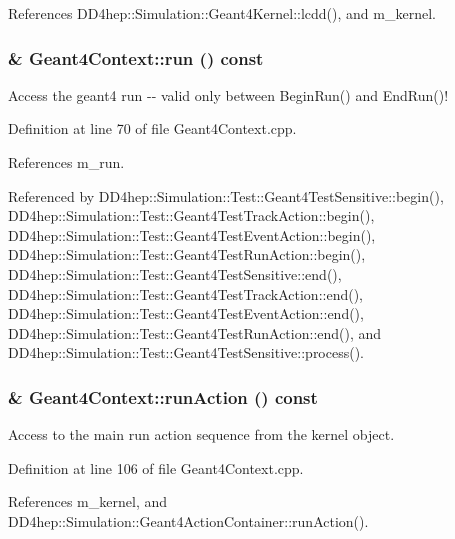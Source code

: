 References DD4hep::Simulation::Geant4Kernel::lcdd(), and m\_\-kernel.\hypertarget{class_d_d4hep_1_1_simulation_1_1_geant4_context_a5bdead358308c241c59b7fa5f68a2b16}{
\subsubsection[{run}]{ \& Geant4Context::run () const}}
\label{class_d_d4hep_1_1_simulation_1_1_geant4_context_a5bdead358308c241c59b7fa5f68a2b16}


Access the geant4 run -\/-\/ valid only between BeginRun() and EndRun()! 

Definition at line 70 of file Geant4Context.cpp.

References m\_\-run.

Referenced by DD4hep::Simulation::Test::Geant4TestSensitive::begin(), DD4hep::Simulation::Test::Geant4TestTrackAction::begin(), DD4hep::Simulation::Test::Geant4TestEventAction::begin(), DD4hep::Simulation::Test::Geant4TestRunAction::begin(), DD4hep::Simulation::Test::Geant4TestSensitive::end(), DD4hep::Simulation::Test::Geant4TestTrackAction::end(), DD4hep::Simulation::Test::Geant4TestEventAction::end(), DD4hep::Simulation::Test::Geant4TestRunAction::end(), and DD4hep::Simulation::Test::Geant4TestSensitive::process().\hypertarget{class_d_d4hep_1_1_simulation_1_1_geant4_context_a1cf651992e7aca8cf16b8ca889690b60}{
\subsubsection[{runAction}]{ \& Geant4Context::runAction () const}}
\label{class_d_d4hep_1_1_simulation_1_1_geant4_context_a1cf651992e7aca8cf16b8ca889690b60}


Access to the main run action sequence from the kernel object. 

Definition at line 106 of file Geant4Context.cpp.

References m\_\-kernel, and DD4hep::Simulation::Geant4ActionContainer::runAction().

